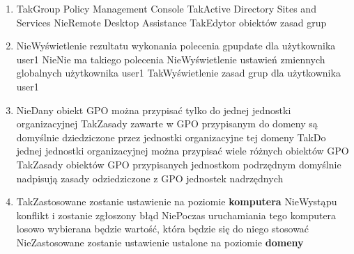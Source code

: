 \begin{enumerate}
		\item {}%
		{Tak}{Group Policy Management Console}%
		{Tak}{Active Directory Sites and Services}%
		{Nie}{Remote Desktop Assistance}%
		{Tak}{Edytor obiektów zasad grup}
		
		\item {}%
		{Nie}{Wyświetlenie rezultatu wykonania polecenia gpupdate dla użytkownika user1}%
		{Nie}{Nie ma takiego polecenia}%
		{Nie}{Wyświetlenie ustawień zmiennych globalnych użytkownika user1}%
		{Tak}{Wyświetlenie zasad grup dla użytkownika user1}
		
		\item {}%
		{Nie}{Dany obiekt GPO można przypisać tylko do jednej jednostki organizacyjnej}%
		{Tak}{Zasady zawarte w GPO przypisanym do domeny są domyślnie dziedziczone przez jednostki organizacyjne tej domeny}%
		{Tak}{Do jednej jednostki organizacyjnej można przypisać wiele różnych obiektów GPO}%
		{Tak}{Zasady obiektów GPO przypisanych jednostkom podrzędnym domyślnie nadpisują zasady odziedziczone z GPO jednostek nadrzędnych}
		
		\item {}%
		{Tak}{Zastosowane zostanie ustawienie na poziomie \textbf{komputera}}%
		{Nie}{Wystąpu konflikt i zostanie zgłoszony błąd}%
		{Nie}{Poczas uruchamiania tego komputera losowo wybierana będzie wartość, która będzie się do niego stosować}%
		{Nie}{Zastosowane zostanie ustawienie ustalone na poziomie \textbf{domeny}}
		
	\end{enumerate}